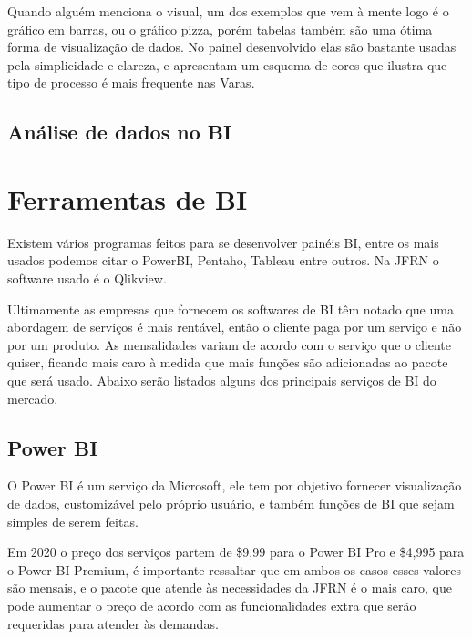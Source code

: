 Quando alguém menciona o visual, um dos exemplos que vem à mente logo é o gráfico em barras, ou o gráfico pizza, porém tabelas também são uma ótima forma de visualização de dados. No painel desenvolvido elas são bastante usadas pela simplicidade e clareza, e apresentam um esquema de cores que ilustra que tipo de processo é mais frequente nas Varas.

\subsection{Análise de dados no BI}



\section{Ferramentas de BI}

Existem vários programas feitos para se desenvolver painéis BI, entre os mais usados podemos citar o PowerBI, Pentaho, Tableau entre outros. Na JFRN o software usado é o Qlikview. 

Ultimamente as empresas que fornecem os softwares de BI têm notado que uma abordagem de serviços é mais rentável, então o cliente paga por um serviço e não por um produto. As mensalidades variam de acordo com o serviço que o cliente quiser, ficando mais caro à medida que mais funções são adicionadas ao pacote que será usado. Abaixo serão listados alguns dos principais serviços de BI do mercado.

\subsection{Power BI}

O Power BI é um serviço da Microsoft, ele tem por objetivo fornecer visualização de dados, customizável pelo próprio usuário, e também funções de BI que sejam simples de serem feitas. 

Em 2020 o preço dos serviços partem de \$9,99 para o Power BI Pro e \$4,995 para o Power BI Premium, é importante ressaltar que em ambos os casos esses valores são mensais, e o pacote que atende às necessidades da JFRN é o mais caro, que pode aumentar o preço de acordo com as funcionalidades extra que serão requeridas para atender às demandas.

